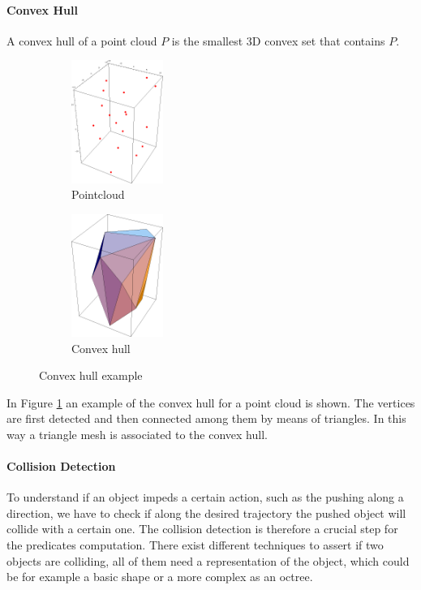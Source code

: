 \paragraph{Convex Hull}
A convex hull of a point cloud $P$ is the smallest 3D convex set that contains $P$. 
\begin{figure}[h]
\centering
\begin{subfigure}[t]{0.3\textwidth}
\centering
\includegraphics[height=4cm]{Img/convexhull/ch1.png}
\caption{Pointcloud}
\end{subfigure}
\begin{subfigure}[t]{0.3\textwidth}
\centering
\includegraphics[height=4cm]{Img/convexhull/ch3.png}
\caption{Convex hull}
\end{subfigure}
\caption{Convex hull example}\label{fig:convexhull_example}
\end{figure}
In Figure \ref{fig:convexhull_example} an example of the convex hull for a point cloud is shown. The vertices are first detected and then connected among them by means of triangles. In this way a triangle mesh is associated to the convex hull. 

\paragraph{Collision Detection}
To understand if an object impeds a certain action, such as the pushing along a direction, we have to check if along the desired trajectory the pushed object will collide with a certain one. The collision detection is therefore a crucial step for the predicates computation. There exist different techniques to assert if two objects are colliding, all of them need a representation of the object, which could be for example a basic shape or a more complex as an octree. 

